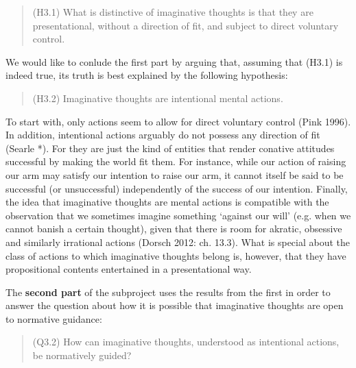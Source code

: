 \vspace{-.2cm}
\begin{quote}
(H3.1) What is distinctive of imaginative thoughts is that they are presentational, without a direction of fit, and subject to direct
voluntary control.
\end{quote}
\vspace{-.2cm}

\noindent We would like to conlude the first part by arguing that, assuming that (H3.1) is indeed true, its truth is best explained by the
following hypothesis:

\vspace{-.2cm}
\begin{quote}
(H3.2) Imaginative thoughts are intentional mental actions.
\end{quote}
\vspace{-.2cm}

\noindent To start with, only actions seem to allow for direct voluntary control (Pink 1996). In addition, intentional actions arguably do not possess any direction of fit (Searle *). For they are just the kind of entities that render conative attitudes successful by making the world fit them. For instance, while our action of raising our arm may satisfy our intention to raise our arm, it cannot itself be said to be successful (or unsuccessful) independently of the success of our intention. Finally, the idea that imaginative thoughts are mental actions is compatible with the observation that we sometimes imagine something `against our will' (e.g. when we cannot banish a certain thought), given that there is room for akratic, obsessive and similarly irrational actions (Dorsch 2012: ch. 13.3). What is special about the class of actions to which imaginative thoughts belong is, however, that they have propositional contents entertained in a presentational way.

The \textbf{second part} of the subproject uses the results from the first in order to answer the question about how it is possible that imaginative thoughts are open to normative guidance:

\vspace{-.2cm}
\begin{quote}
(Q3.2) How can imaginative thoughts, understood as intentional actions, be normatively guided?
\end{quote}
\vspace{-.2cm}

